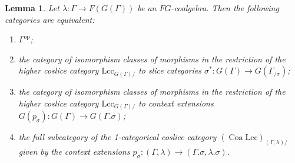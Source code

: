 \documentclass[a4paper]{article}
\newtheorem{lemma}[theorem]{Lemma}
\theoremstyle{remark}
\theoremstyle{definition}
\begin{document}
\begin{lemma}
  \label{lem:cats-of-weak-exts}
  Let $\lambda : \Gamma \rightarrow F(G(\Gamma))$ be an $FG$-coalgebra.
  Then the following categories are equivalent:
  \begin{enumerate}[label={(\arabic*)}]
    \item
      \label{itm:locally-discrete-gamma-op}
      $\Gamma^\mathrm{op}$;
    \item
      \label{itm:slice-2-category}
      the category of isomorphism classes of morphisms in the restriction of the higher coslice category $\mathrm{Lcc}_{G(\Gamma) /}$ to slice categories $\sigma^* : G(\Gamma) \rightarrow G(\Gamma_{/ \sigma})$;
    \item
      \label{itm:ext-2-category}
      the category of isomorphism classes of morphisms in the restriction of the higher coslice category $\mathrm{Lcc}_{G(\Gamma) /}$ to context extensions $G(p_\sigma) : G(\Gamma) \rightarrow G(\Gamma.\sigma)$;
    \item
      \label{itm:ext-1-category}
      the full subcategory of the 1-categorical coslice category $(\operatorname{Coa} \mathrm{Lcc})_{(\Gamma, \lambda) /}$ given by the context extensions $p_\sigma : (\Gamma, \lambda) \rightarrow (\Gamma.\sigma, \lambda.\sigma)$.
  \end{enumerate}
\end{lemma}
\end{document}
